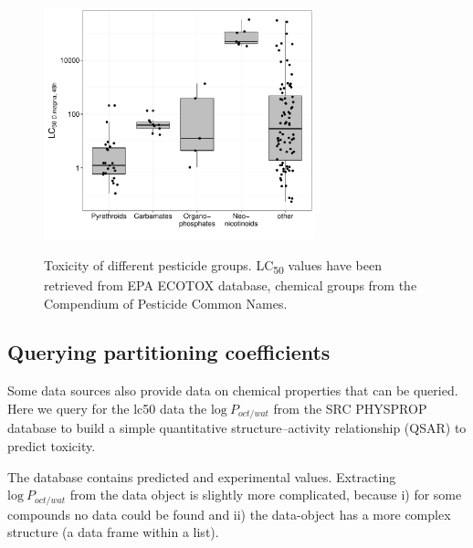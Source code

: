 \begin{figure}[ht]
\begin{knitrout}
\color{fgcolor}

{\centering 
\includegraphics[width=0.7\textwidth]{chapters/webchem/plot_lc50-1.pdf}
}



\end{knitrout}
\caption[Toxicity of different pesticide groups.]{Toxicity of different pesticide groups. LC\textsubscript{50} values have been retrieved from EPA ECOTOX database, chemical groups from the Compendium of Pesticide Common Names.}
\label{fig:fig2}
\end{figure}


\subsection[Querying partitioning coefficients]{Querying partitioning coefficients}
Some data sources also provide data on chemical properties that can be queried.
Here we query for the lc50 data the $\mathrm{log}~P_{oct/wat}$ from the SRC PHYSPROP database to build a simple quantitative structure–activity relationship (QSAR) to predict toxicity.

\begin{knitrout}
\color{fgcolor}\begin{kframe}
\begin{alltt}
 \hlkwb{<-} \hlopt{$}
\end{alltt}
\end{kframe}
\end{knitrout}

The database contains predicted and experimental values.
Extracting \\ $\mathrm{log}~P_{oct/wat}$ from the data object is slightly more complicated,  
because i) for some compounds no data could be found and ii) the data-object has a more complex structure (a data frame within a list).

